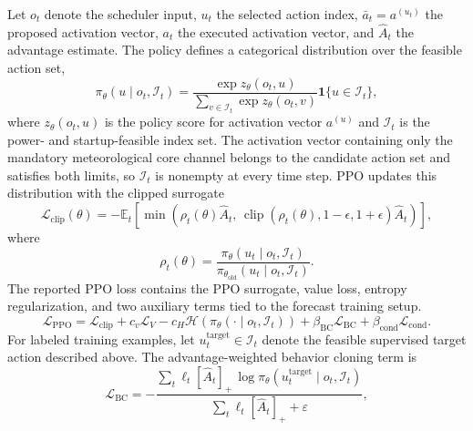 Let $o_t$ denote the scheduler input, $u_t$ the selected action index,
$\bar a_t=a^{(u_t)}$ the proposed activation vector, $a_t$ the executed
activation vector, and $\hat{A}_t$ the advantage estimate. The policy defines a
categorical distribution over the feasible action set,
\begin{equation}
  \pi_{\theta}(u\mid o_t,\mathcal{I}_t)
  =
  \frac{\exp z_{\theta}(o_t,u)}
  {\sum_{v\in\mathcal{I}_t}\exp z_{\theta}(o_t,v)}
  \mathbf{1}\{u\in\mathcal{I}_t\},
  \label{eq:masked_policy}
\end{equation}
where $z_{\theta}(o_t,u)$ is the policy score for activation vector $a^{(u)}$ and
$\mathcal{I}_t$ is the power- and startup-feasible index set. The activation
vector containing only the mandatory meteorological core channel belongs to the
candidate action set and satisfies both limits, so
$\mathcal{I}_t$ is nonempty at every time step.
PPO updates this distribution with the clipped surrogate
\begin{equation}
  \mathcal{L}_{\mathrm{clip}}(\theta)
  =
  -\mathbb{E}_t
  \left[
  \min\left(
  \rho_t(\theta)\hat{A}_t,\,
  \operatorname{clip}\!\left(\rho_t(\theta),1-\epsilon,1+\epsilon\right)
  \hat{A}_t
  \right)
  \right],
  \label{eq:ppo_clip}
\end{equation}
where
\begin{equation}
  \rho_t(\theta)
  =
  \frac{\pi_{\theta}(u_t\mid o_t,\mathcal{I}_t)}
       {\pi_{\theta_{\mathrm{old}}}(u_t\mid o_t,\mathcal{I}_t)} .
\end{equation}
The reported PPO loss contains the PPO surrogate, value loss, entropy
regularization, and two auxiliary terms tied to the forecast training setup.
\begin{equation}
  \mathcal{L}_{\mathrm{PPO}}
  =
  \mathcal{L}_{\mathrm{clip}}
  + c_v\mathcal{L}_{V}
  - c_H\mathcal{H}\!\left(\pi_{\theta}(\cdot\mid o_t,\mathcal{I}_t)\right)
  + \beta_{\mathrm{BC}}\mathcal{L}_{\mathrm{BC}}
  + \beta_{\mathrm{cond}}\mathcal{L}_{\mathrm{cond}} .
  \label{eq:pdppo_loss}
\end{equation}
For labeled training examples, let $u_t^{\mathrm{target}}\in\mathcal{I}_t$
denote the feasible supervised target action described above. The
advantage-weighted behavior cloning term is
\begin{equation}
  \mathcal{L}_{\mathrm{BC}}
  =
  -
  \frac{
  \sum_t \ell_t[\hat{A}_t]_+\,\log
  \pi_{\theta}(u_t^{\mathrm{target}}\mid o_t,\mathcal{I}_t)
  }{
  \sum_t \ell_t[\hat{A}_t]_+ + \varepsilon
  },
  \label{eq:bc_loss}
\end{equation}
